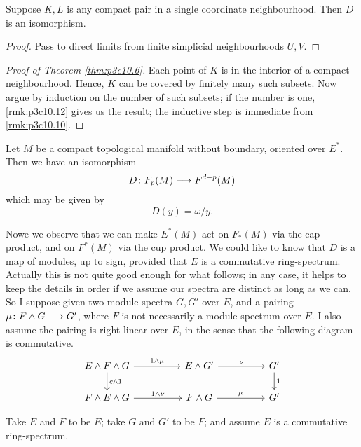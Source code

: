 \documentclass[../main]{subfiles}
\begin{document}
\begin{remark}\label{rmk:p3c10.12}
Suppose $K,L$ is any compact pair in a single coordinate neighbourhood. Then $D$ is an isomorphism.
\end{remark}
\begin{proof}
Pass to direct limits from finite simplicial neighbourhoods $U,V$.
\end{proof}
\begin{proof}[Proof of Theorem \ref{thm:p3c10.6}]
Each point of $K$ is in the interior of a compact neighbourhood. Hence, $K$ can be covered by finitely many such subsets. Now argue by induction on the number of such subsets; if the number is one, \ref{rmk:p3c10.12} gives us the result; the inductive step is immediate from \ref{rmk:p3c10.10}.
\end{proof}
\begin{corollary}\label{cor:p3c10.13}
Let $M$ be a compact topological manifold without boundary, oriented over $E^*$. Then we have an isomorphism
\[D \colon F_p(M) \longrightarrow F^{d-p}(M)\]
which may be given by
\[D(y) = \omega / y.\]
\end{corollary}
Nowe we observe that we can make $E^*(M)$ act on $F_*(M)$ via the cap product, and on $F^*(M)$ via the cup product. We could like to know that $D$ is a map of modules, up to sign, provided that $E$ is a commutative ring-spectrum. Actually this is not quite good enough for what follows; in any case, it helps to keep the details in order if we assume our spectra are distinct as long as we can. So I suppose given two module-spectra $G,G'$ over $E$, and a pairing $\mu \colon F \wedge G \longrightarrow G'$, where $F$ is not necessarily a module-spectrum over $E$. I also assume the pairing is right-linear over $E$, in the sense that the following diagram is commutative.
\[
\begin{tikzcd}
E\wedge F \wedge G \arrow[rr, "1 \wedge \mu"] \arrow[d, "c \wedge 1"] &  & E\wedge G' \arrow[rr, "\nu"] &  & G' \arrow[d, "1"] \\
F \wedge E \wedge G \arrow[rr, "1 \wedge \nu"]                        &  & F\wedge G \arrow[rr, "\mu"]  &  & G'               
\end{tikzcd}
\]
\begin{examples}
Take $E$ and $F$ to be $E$; take $G$ and $G'$ to be $F$; and assume $E$ is a commutative ring-spectrum.
\end{examples}
\noindent{}
\end{document}
